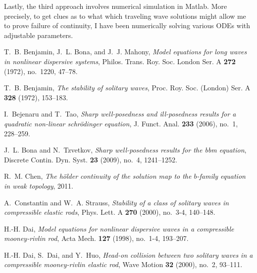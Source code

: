 \documentclass[12pt,reqno]{amsart}
\begin{document}
Lastly, the third approach involves numerical simulation in Matlab. More
precisely, to get clues as to what which traveling wave solutions might allow me
to prove failure of continuity, I have been numerically solving various ODEs
with adjustable parameters. 
\providecommand{\bysame}{\leavevmode\hbox to3em{\hrulefill}\thinspace}
\providecommand{\MR}{\relax\ifhmode\unskip\space\fi MR }
\providecommand{\MRhref}[2]{%
  \href{http://www.ams.org/mathscinet-getitem?mr=#1}{#2}
}
\providecommand{\href}[2]{#2}
\begin{thebibliography}{dLKT07}

T.~B. Benjamin, J.~L. Bona, and J.~J. Mahony, \emph{Model equations for long
  waves in nonlinear dispersive systems}, Philos. Trans. Roy. Soc. London Ser.
  A \textbf{272} (1972), no.~1220, 47--78.

T.~B. Benjamin, \emph{The stability of solitary waves}, Proc. Roy. Soc.
  (London) Ser. A \textbf{328} (1972), 153--183.

I.~Bejenaru and T.~Tao, \emph{Sharp well-posedness and ill-posedness results
  for a quadratic non-linear schr{\"o}dinger equation}, J. Funct. Anal.
  \textbf{233} (2006), no.~1, 228--259.

J.~L. Bona and N.~Tzvetkov, \emph{Sharp well-posedness results for the bbm
  equation}, Discrete Contin. Dyn. Syst. \textbf{23} (2009), no.~4, 1241--1252.

R.~M. Chen, \emph{The h{\"o}lder continuity of the solution map to the
  $b$-family equation in weak topology}, 2011.

A.~Constantin and W.~A. Strauss, \emph{Stability of a class of solitary waves
  in compressible elastic rods}, Phys. Lett. A \textbf{270} (2000), no.~3-4,
  140--148.

H.-H. Dai, \emph{Model equations for nonlinear dispersive waves in a
  compressible mooney-rivlin rod}, Acta Mech. \textbf{127} (1998), no.~1-4,
  193--207.

H.-H. Dai, S.~Dai, and Y.~Huo, \emph{Head-on collision between two solitary
  waves in a compressible mooney-rivlin elastic rod}, Wave Motion \textbf{32}
  (2000), no.~2, 93--111.


\end{thebibliography}
\end{document}
